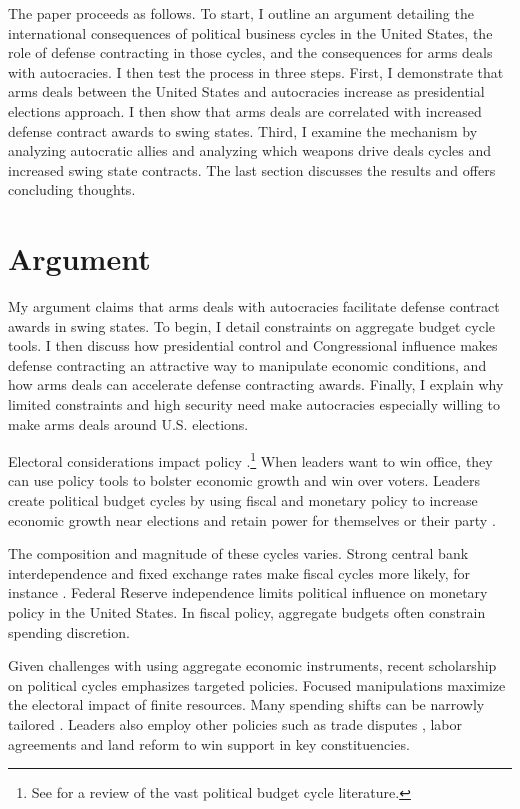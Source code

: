 \documentclass[12pt]{article}
\begin{document}
The paper proceeds as follows. 
To start, I outline an argument detailing the international consequences of political business cycles in the United States, the role of defense contracting in those cycles, and the consequences for arms deals with autocracies. 
I then test the process in three steps. 
First, I demonstrate that arms deals between the United States and autocracies increase as presidential elections approach. 
I then show that arms deals are correlated with increased defense contract awards to swing states.
Third, I examine the mechanism by analyzing autocratic allies and analyzing which weapons drive deals cycles and increased swing state contracts.
The last section discusses the results and offers concluding thoughts.


\section{Argument}


My argument claims that arms deals with autocracies facilitate defense contract awards in swing states.
To begin, I detail constraints on aggregate budget cycle tools.
I then discuss how presidential control and Congressional influence makes defense contracting an attractive way to manipulate economic conditions, and how arms deals can accelerate defense contracting awards. 
Finally, I explain why limited constraints and high security need make autocracies especially willing to make arms deals around U.S. elections.


Electoral considerations impact policy \citep{Nordhaus1975}.\footnote{See \citet{Dubois2016} for a review of the vast political budget cycle literature.} 
When leaders want to win office, they can use policy tools to bolster economic growth and win over voters. 
Leaders create political budget cycles by using fiscal and monetary policy to increase economic growth near elections and retain power for themselves or their party \citep{Tufte1978, Rogoff1987}. 


The composition and magnitude of these cycles varies. 
Strong central bank interdependence and fixed exchange rates make fiscal cycles more likely, for instance \citep{ClarkHallerberg2000}. 
Federal Reserve independence limits political influence on monetary policy in the United States. 
In fiscal policy, aggregate budgets often constrain spending discretion.


Given challenges with using aggregate economic instruments, recent scholarship on political cycles emphasizes targeted policies.
Focused manipulations maximize the electoral impact of finite resources.
Many spending shifts can be narrowly tailored \citep[pg. 248]{Dubois2016}.
Leaders also employ other policies such as trade disputes \citep{Conconietal2017}, labor agreements \citep{Ahlquist2010} and land reform \citep{Philips2020} to win support in key constituencies.
\end{document}
